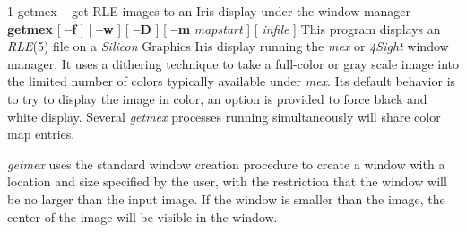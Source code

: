 %
%
%
 1
getmex -- get RLE images to an Iris display under the window manager
{\bf getmex}
[
{\bf --f}
] [
{\bf --w}
] [
{\bf --D}
] [
{\bf --m} 
{\it mapstart}
] [ 
{\it infile}
]
This program displays an
{\it RLE}{\rm (5)}
file on a
{\it Silicon} Graphics Iris
display running the
{\it mex}
or
{\it 4Sight}
window manager.  It uses a dithering technique to take a
full-color or gray scale image into the limited number of colors
typically available under
{\it mex}{\rm .}
Its default behavior is to try to
display the image in color, an option is provided to force black and
white display.  Several
{\it getmex}
processes running simultaneously will share color map entries.

{\it getmex}
uses the standard 
window creation procedure to create a window with a location and size
specified by the user, with the restriction that the window will be no larger
than the input image.  If the window is smaller than the image, the center of
the image will be visible in the window.

